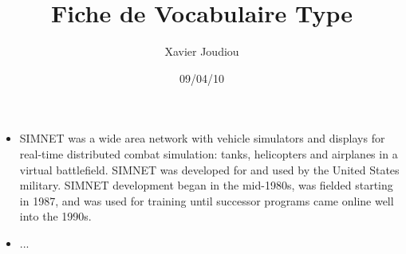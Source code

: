\documentclass[11pt,a4paper]{article}
\title{Fiche de Vocabulaire Type}
\author{Xavier Joudiou}
\date{09/04/10}
\begin{document}
	
  \begin{itemize}
  \renewcommand{\labelitemi}{$\Rightarrow$}
	\item SIMNET was a wide area network with vehicle simulators and displays for real-time distributed combat simulation: tanks, helicopters and airplanes in a virtual battlefield. SIMNET was developed for and used by the United States military. SIMNET development began in the mid-1980s, was fielded starting in 1987, and was used for training until successor programs came online well into the 1990s.
	\item ...
  \end{itemize}
\end{document}
